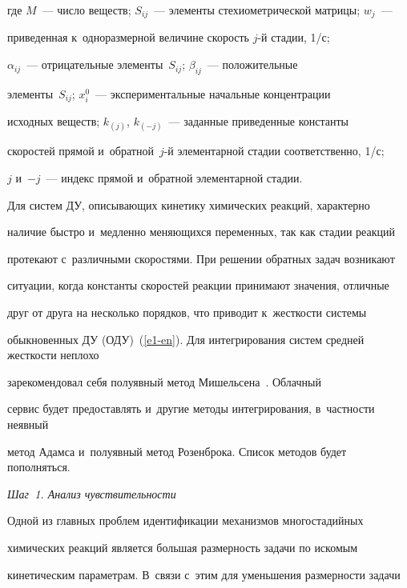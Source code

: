 где $M$~--- число веществ; $S_{ij}$~--- элементы стехиометрической матрицы; $w_j$~--- 


приведенная к~одноразмерной величине скорость $j$-й стадии, 1/с;  


$\alpha_{ij}$~--- отрицательные элементы~$S_{ij}$; $\beta_{ij}$~--- положительные 


элементы~$S_{ij}$; $x_i^0$~--- экспериментальные начальные концентрации 


исходных веществ; $k_{(j)}$, $k_{(-j)}$~--- заданные приведенные константы 


скоростей прямой и~обратной~$j$-й элементарной стадии соответственно, 1/с; 


$j$ и~$-j$~--- индекс прямой и~обратной элементарной стадии.





  Для систем ДУ, описывающих кинетику химических реакций, характерно 


наличие быстро и~медленно меняющихся переменных, так как стадии реакций 


протекают с~различными скоростями. При решении обратных задач возникают 


ситуации, когда константы скоростей реакции принимают значения, отличные 


друг от друга на несколько порядков, что приводит к~жест\-кости системы 


обыкновенных ДУ (ОДУ)~(\ref{e1-en}). Для интегрирования систем средней жест\-кости неплохо 


зарекомендовал себя полуявный метод Мишельсена~\cite{1-en}. Облачный 


сервис будет предоставлять и~другие методы интегрирования, в~частности неявный 


метод Адамса и~полуявный метод Розенброка. Список методов будет пополняться.


  


  \medskip


  \textit{Шаг~1. Анализ чувствительности}


  \medskip


  


  Одной из главных проблем идентификации механизмов многостадийных 


химических реакций является большая размерность задачи по искомым 


кинетическим параметрам. В~связи с~этим для уменьшения размерности задачи 


